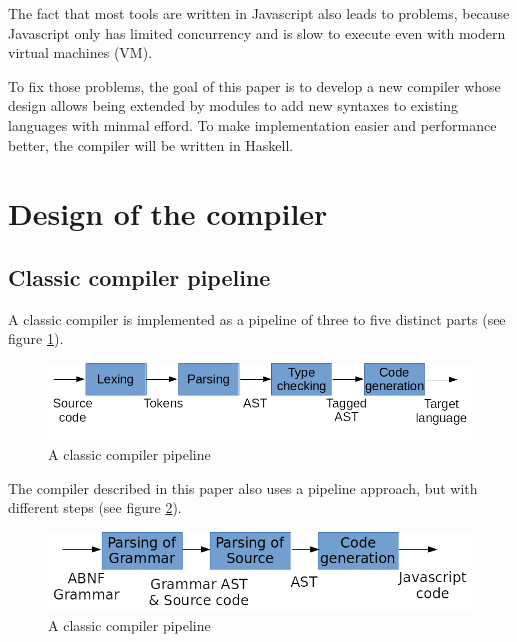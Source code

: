 The fact that most tools are written in Javascript also leads to problems, because Javascript only has limited concurrency and is slow to execute even with modern virtual machines (VM).

To fix those problems, the goal of this paper is to develop a new compiler whose design allows being extended by modules to add new syntaxes to existing languages with minmal efford. To make implementation easier and performance better, the compiler will be written in Haskell.

\section{Design of the compiler}

\subsection{Classic compiler pipeline}

A classic compiler is implemented as a pipeline of three to five distinct parts (see figure \ref{fig:compiler_pipeline}).

\begin{figure}[H]
\includegraphics[width=\columnwidth]{./compiler_pipeline.png}
\caption{A classic compiler pipeline}
\label{fig:compiler_pipeline}
\end{figure}

The compiler described in this paper also uses a pipeline approach, but with different steps (see figure \ref{fig:pack.hs_pipeline}).

\begin{figure}[H]
\includegraphics[width=\columnwidth]{./pack_hs_pipeline.png}
\caption{A classic compiler pipeline}
\label{fig:pack.hs_pipeline}
\end{figure}

